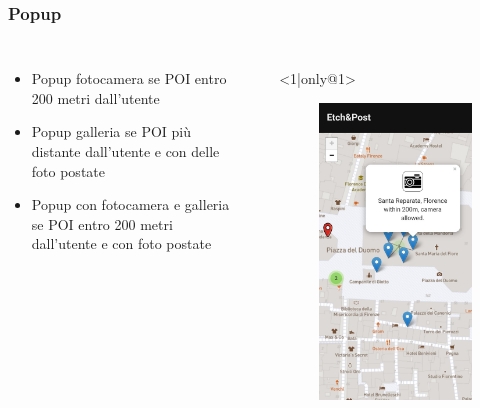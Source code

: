 \documentclass{beamer}
\begin{document}
\begin{frame}
\frametitle{Popup}
\begin{columns}
\begin{itemize}
 \item <1-> Popup fotocamera se POI entro 200 metri dall'utente
 \item <2-> Popup galleria se POI pi\`u distante dall'utente e con delle foto postate
 \item <3-> Popup con fotocamera e galleria se POI entro 200 metri dall'utente e con foto postate
\end{itemize}

\begin{itemize}
	\item[] <1|only@1> 
		\begin{figure}[!h]
 			\centering
 			\includegraphics[scale=0.1]{"Immagini/camera.jpg"}

\end{figure}
\end{itemize}
\end{columns}
\end{frame}
\end{document}
